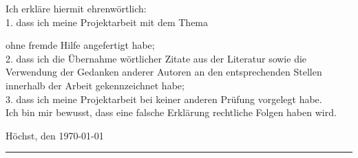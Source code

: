 Ich erkläre hiermit ehrenwörtlich:\\
1. dass ich meine Projektarbeit mit dem Thema\\
\begin{quote}
\textit{\titel}
\end{quote}

ohne fremde Hilfe angefertigt habe;\\
2. dass ich die Übernahme wörtlicher Zitate aus der Literatur sowie die Verwendung der Gedanken
anderer Autoren an den entsprechenden Stellen innerhalb der Arbeit gekennzeichnet habe;\\
3. dass ich meine Projektarbeit bei keiner anderen Prüfung vorgelegt habe.\\
Ich bin mir bewusst, dass eine falsche Erklärung rechtliche Folgen haben wird.





Höchst, den \today


\rule[-0.2cm]{5cm}{0.5pt}

\textsc{\autor} 
